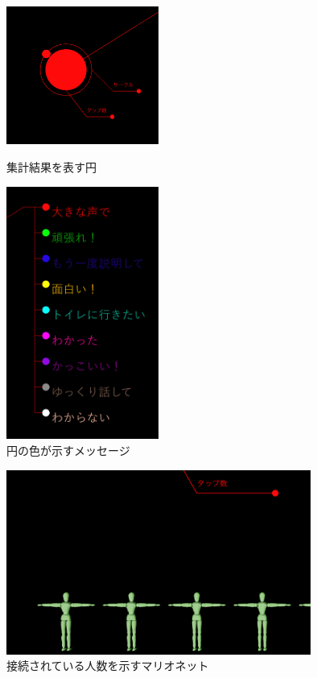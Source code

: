 \documentclass{funthesis}
\begin{document}
\begin{figure}[H]
 \begin{minipage}{0.5\hsize}
  \begin{center}
  \includegraphics[width=50mm]{./img/svcircle.png}
  \end{center}
  \caption{集計結果を表す円}
  \label{svcircle}
 \end{minipage}
 \begin{minipage}{0.5\hsize}
  \begin{center}
  \includegraphics[width=50mm]{./img/svmessagearea.png}
  \end{center}
  \caption{円の色が示すメッセージ}
  \label{svmessage}
  \end{minipage}
\end{figure}

\begin{figure}[H]
 \begin{center}
  \includegraphics[width=100mm]{./img/mario2.png}
 \end{center}
 \caption{接続されている人数を示すマリオネット}
 \label{mario}
\end{figure}
\end{document}
